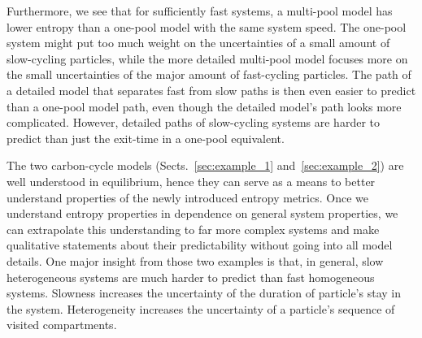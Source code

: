 \documentclass[smallextended]{svjour3}
\begin{document}
Furthermore, we see that for sufficiently fast systems, a multi-pool model has lower entropy than a one-pool model with the same system speed.
The one-pool system might put too much weight on the uncertainties of a small amount of slow-cycling particles, while the more detailed multi-pool model focuses more on the small uncertainties of the major amount of fast-cycling particles.
The path of a detailed model that separates fast from slow paths is then even easier to predict than a one-pool model path, even though the detailed model's path looks more complicated.
However, detailed paths of slow-cycling systems are harder to predict than just the exit-time in a one-pool equivalent.

The two carbon-cycle models (Sects.~\ref{sec:example_1} and~\ref{sec:example_2}) are well understood in equilibrium, hence they can serve as a means to better understand properties of the newly introduced entropy metrics.
Once we understand entropy properties in dependence on general system properties, we can extrapolate this understanding to far more complex systems and make qualitative statements about their predictability without going into all model details.
One major insight from those two examples is that, in general, slow heterogeneous systems are much harder to predict than fast homogeneous systems.
Slowness increases the uncertainty of the duration of particle's stay in the system.
Heterogeneity increases the uncertainty of a particle's sequence of visited compartments.
\end{document}
